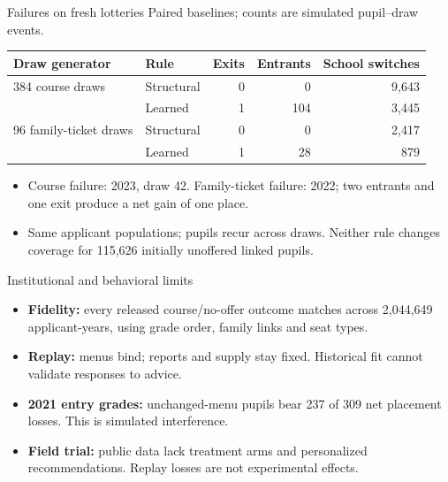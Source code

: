 \begin{frame}{Failures on fresh lotteries}
\small
Paired baselines; counts are simulated pupil--draw events.
\begin{center}
\begin{tabular}{llrrr}
\hline
Draw generator & Rule & Exits & Entrants & School switches\\
\hline
384 course draws & Structural & 0 & 0 & 9,643\\
 & Learned & 1 & 104 & 3,445\\
96 family-ticket draws & Structural & 0 & 0 & 2,417\\
 & Learned & 1 & 28 & 879\\
\hline
\end{tabular}
\end{center}
\begin{itemize}
  \item Course failure: 2023, draw 42. Family-ticket failure: 2022;
  two entrants and one exit produce a net gain of one place.
  \item Same applicant populations; pupils recur across draws.
  Neither rule changes coverage for 115,626 initially unoffered linked pupils.
\end{itemize}
\end{frame}

\begin{frame}{Institutional and behavioral limits}
\small
\begin{itemize}
  \item \textbf{Fidelity:} every released course/no-offer outcome matches
  across 2,044,649 applicant-years, using grade order, family links and seat types.
  \item \textbf{Replay:} menus bind; reports and supply stay fixed.
  Historical fit cannot validate responses to advice.
  \item \textbf{2021 entry grades:} unchanged-menu pupils bear 237 of 309
  net placement losses. This is simulated interference.
  \item \textbf{Field trial:} public data lack treatment arms and personalized
  recommendations. Replay losses are not experimental effects.
\end{itemize}
\end{frame}


